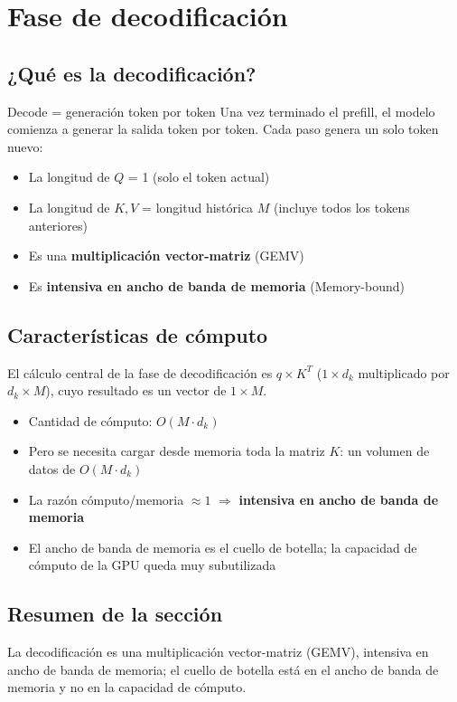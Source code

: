 \section{Fase de decodificación}

\subsection{¿Qué es la decodificación?}

\begin{importantbox}{Decode = generación token por token}
Una vez terminado el prefill, el modelo comienza a generar la salida token por token. Cada paso genera un solo token nuevo:
\begin{itemize}
  \item La longitud de $Q$ = 1 (solo el token actual)
  \item La longitud de $K, V$ = longitud histórica $M$ (incluye todos los tokens anteriores)
  \item Es una \textbf{multiplicación vector-matriz} (GEMV)
  \item Es \textbf{intensiva en ancho de banda de memoria} (Memory-bound)
\end{itemize}
\end{importantbox}

\subsection{Características de cómputo}

El cálculo central de la fase de decodificación es $q \times K^T$ ($1 \times d_k$ multiplicado por $d_k \times M$), cuyo resultado es un vector de $1 \times M$.

\begin{itemize}
  \item Cantidad de cómputo: $O(M \cdot d_k)$
  \item Pero se necesita cargar desde memoria toda la matriz $K$: un volumen de datos de $O(M \cdot d_k)$
  \item La razón cómputo/memoria $\approx 1$ $\Rightarrow$ \textbf{intensiva en ancho de banda de memoria}
  \item El ancho de banda de memoria es el cuello de botella; la capacidad de cómputo de la GPU queda muy subutilizada
\end{itemize}

\subsection{Resumen de la sección}

La decodificación es una multiplicación vector-matriz (GEMV), intensiva en ancho de banda de memoria; el cuello de botella está en el ancho de banda de memoria y no en la capacidad de cómputo.

